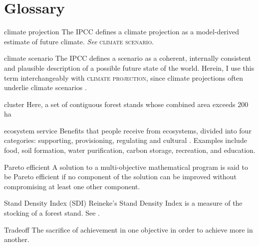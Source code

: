
\chapter*{Glossary}      %
\thispagestyle{plain}
%
\begin{glossary}

\item[climate projection] The IPCC defines a climate projection as a model-derived estimate of future climate. \textit{See} \textsc{climate scenario}\cite{ipcc2013Definition}.

\item[climate scenario] The IPCC defines a scenario as a coherent, internally consistent and plausible description of a possible future state of the world. Herein, I use this term interchangeably with \textsc{climate projection}, since climate projections often underlie climate scenarios \cite{ipcc2013Definition}.

\item[cluster] Here, a set of contiguous forest stands whose combined area exceeds 200 ha

\item[ecosystem service] Benefits that people receive from ecosystems, divided into four categories: supporting, provisioning, regulating and cultural \cite{assessment2005ecosystems}. Examples include food, soil formation, water purification, carbon storage, recreation, and education.

\item[Pareto efficient] A solution to a multi-objective mathematical program is said to be Pareto efficient if no component of the solution can be improved without compromising at least one other component.

\item[Stand Density Index (SDI)] Reineke's Stand Density Index is a measure of the stocking of a forest stand. See \cite{reineke1933perfecting}.

\item[Tradeoff] The sacrifice of achievement in one objective in order to achieve more in another.
 
\end{glossary}